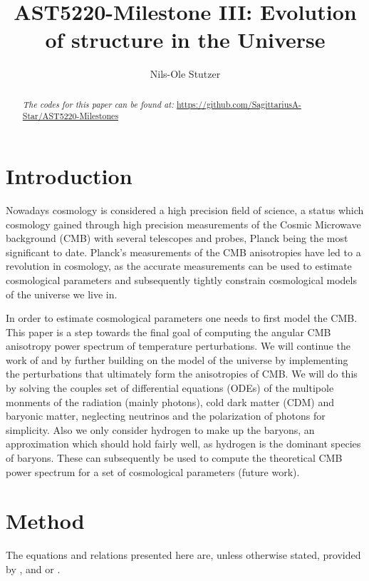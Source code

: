 \documentclass[twocolumn]{aastex62}
\begin{document}
\title{\Large AST5220-Milestone III: Evolution of structure in the Universe}

\author{Nils-Ole Stutzer}

\begin{abstract}
    
    \textit{The codes for this paper can be found at:} \newline \url{https://github.com/SagittariusA-Star/AST5220-Milestones}
\end{abstract}

\section{Introduction} \label{sec:Intro}
Nowadays cosmology is considered a high precision field of science, a status which cosmology gained through high precision measurements of the Cosmic Microwave background (CMB) with several telescopes and probes, Planck \citep[]{planckcollaboration:2018} being the most significant to date. Planck's measurements of the CMB anisotropies have led to a revolution in cosmology, as the accurate measurements can be used to estimate cosmological parameters and subsequently tightly constrain cosmological models of the universe we live in.

In order to estimate cosmological parameters one needs to first model the CMB. This paper is a step towards the final goal of computing the angular CMB anisotropy power spectrum of temperature perturbations. We will continue the work of \cite{stutzer:2020a} and \cite{stutzer:2020b} by further building on the model of the universe by implementing the perturbations that ultimately form the anisotropies of CMB. We will do this by solving the couples set of differential equations (ODEs) of the multipole monments of the radiation (mainly photons), cold dark matter (CDM) and baryonic matter, neglecting neutrinos and the polarization of photons for simplicity. Also we only consider hydrogen to make up the baryons, an approximation which should hold fairly well, as hydrogen is the dominant species of baryons. These can subsequently be used to compute the theoretical CMB power spectrum for a set of cosmological parameters (future work).

\section{Method} \label{sec:Method}
The equations and relations presented here are, unless otherwise stated, provided by \cite{callin:2006}, \cite{winther:2020b} and or \cite{dodelson:2003}.
\end{document}
